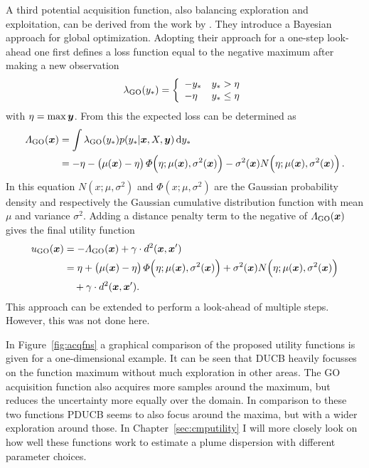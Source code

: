 A third potential acquisition function, also balancing exploration and 
exploitation, can be derived from the work by \textcite{Osborne:2009tn}. They 
introduce a Bayesian approach for global optimization. Adopting their approach 
for a one-step look-ahead one first defines a loss function equal to the 
negative maximum after making a new observation
\begin{equation}
    \lambda_{\mathrm{GO}} (y_*) = \left\{ \begin{array}{ll}-y_* & y_* > \eta \\ -\eta 
            & y_* \leq \eta \end{array} \right.
\end{equation}
with $\eta = \max \bm{y}$. From this the expected loss can be determined as
\begin{equation}\begin{split}
    \varLambda\ped{GO}(\vc x) &= \int \lambda\ped{GO}(y_*) p(y_* | \vc x, X, \vc 
    y) \dif y_* \\
    &= -\eta - \del{\mu(\vc x) - \eta} \varPhi\!\del{\eta; \mu(\vc x), 
        \sigma^2(\vc x)} - \sigma^2(\vc x) N\!\del{\eta; \mu(\vc x), 
        \sigma^2(\vc x)}
    \text{.}
\end{split}\end{equation}
In this equation $N(x; \mu, \sigma^2)$ and $\varPhi(x; \mu, \sigma^2)$ are the 
Gaussian probability density and respectively the Gaussian cumulative 
distribution function with mean $\mu$ and variance $\sigma^2$. Adding a distance 
penalty term to the negative of $\varLambda_{\mathrm{GO}}(\bm{x})$ gives the final 
utility function
\begin{align}\begin{split}
    u\ped{GO}(\vc x) &= -\varLambda\ped{GO}(\vc x) + \gamma \cdot d^2(\vc x, \vc 
    x') \\
    &= \eta + \del{\mu(\vc x) - \eta} \varPhi\!\del{\eta; \mu(\vc x), 
        \sigma^2(\vc x)} + \sigma^2(\vc x) N\!\del{\eta; \mu(\vc x), 
        \sigma^2(\vc x)}\\ &\quad+ \gamma \cdot d^2(\vc x, \vc x') \text{.}
\end{split} \end{align}
This approach can be extended to perform a look-ahead of multiple steps.  
However, this was not done here.

In Figure~\ref{fig:acqfns} a graphical comparison of the proposed utility 
functions is given for a one-dimensional example. It can be seen that DUCB 
heavily focusses on the function maximum without much exploration in other 
areas. The GO acquisition function also acquires more samples around the 
maximum, but reduces the uncertainty more equally over the domain. In comparison 
to these two functions PDUCB seems to also focus around the maxima, but with 
a wider exploration around those. In Chapter~\ref{sec:cmputility} I will more 
closely look on how well these functions work to estimate a plume dispersion 
with different parameter choices.

